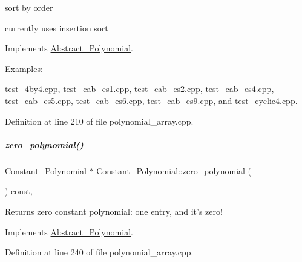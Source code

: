 sort by order 

currently uses insertion sort 

Implements \hyperlink{group__polygroup_a1fcdd29c324c660ea935197c39e682f2}{Abstract\+\_\+\+Polynomial}.

\begin{Desc}
\item[Examples\+: ]\par
\hyperlink{test_4by4_8cpp-example}{test\+\_\+4by4.\+cpp}, \hyperlink{test_cab_es1_8cpp-example}{test\+\_\+cab\+\_\+es1.\+cpp}, \hyperlink{test_cab_es2_8cpp-example}{test\+\_\+cab\+\_\+es2.\+cpp}, \hyperlink{test_cab_es4_8cpp-example}{test\+\_\+cab\+\_\+es4.\+cpp}, \hyperlink{test_cab_es5_8cpp-example}{test\+\_\+cab\+\_\+es5.\+cpp}, \hyperlink{test_cab_es6_8cpp-example}{test\+\_\+cab\+\_\+es6.\+cpp}, \hyperlink{test_cab_es9_8cpp-example}{test\+\_\+cab\+\_\+es9.\+cpp}, and \hyperlink{test_cyclic4_8cpp-example}{test\+\_\+cyclic4.\+cpp}.\end{Desc}


Definition at line 210 of file polynomial\+\_\+array.\+cpp.

\mbox{\label{group__polygroup_af7933d269e23525f1f357c0e00bc71ea}} 
\subparagraph{\texorpdfstring{zero\+\_\+polynomial()}{zero\_polynomial()}}
{\footnotesize\ttfamily \hyperlink{group__polygroup_class_constant___polynomial}{Constant\+\_\+\+Polynomial} $\ast$ Constant\+\_\+\+Polynomial\+::zero\+\_\+polynomial (\begin{DoxyParamCaption}{ }\end{DoxyParamCaption}) const\hspace{0.3cm}{\ttfamily [override]}, {\ttfamily [virtual]}}

\begin{DoxyReturn}{Returns}
zero constant polynomial\+: one entry, and it's zero! 
\end{DoxyReturn}


Implements \hyperlink{group__polygroup_ab50acaac5654329c0299d5694a25b1ed}{Abstract\+\_\+\+Polynomial}.



Definition at line 240 of file polynomial\+\_\+array.\+cpp.

\label{class_dense___univariate___integer___polynomial}
